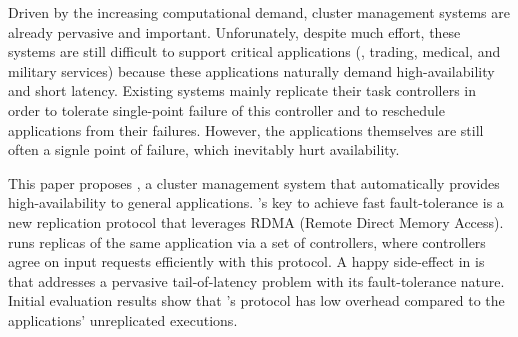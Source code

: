 
Driven by the increasing computational demand, cluster management systems 
are already pervasive and important. Unforunately, despite much effort, these 
systems are still difficult to support critical applications (\eg, trading, 
medical, and military services) because these applications naturally demand 
high-availability and short latency. Existing systems mainly replicate their 
task controllers in order to tolerate single-point failure of this controller 
and to reschedule applications from their failures. However, the applications 
themselves are still often a signle point of failure, which inevitably hurt 
availability.


This paper proposes \xxx, a cluster management system that automatically 
provides high-availability to general applications. \xxx's key to achieve fast 
fault-tolerance is a new \paxos replication protocol that leverages RDMA 
(Remote Direct Memory Access). \xxx runs replicas of the same application via a 
set of controllers, where controllers agree on input requests efficiently with 
this protocol. A happy side-effect in \xxx is that \xxx addresses a pervasive 
tail-of-latency problem with its fault-tolerance nature. Initial evaluation 
results show that \xxx's protocol has low overhead compared to the 
applications' unreplicated executions.


